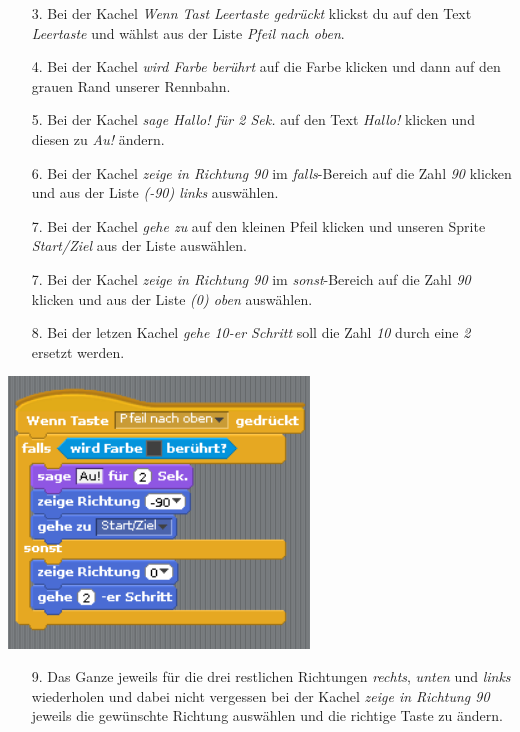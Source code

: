 \begin{itemize}
\item[3. ] Bei der Kachel \textit{Wenn Tast Leertaste gedr{\"u}ckt} klickst du auf den Text \textit{Leertaste} und w{\"a}hlst aus der Liste \textit{Pfeil nach oben}.
\item[4. ] Bei der Kachel \textit{wird Farbe ber{\"u}hrt} auf die Farbe klicken und dann auf den grauen Rand unserer Rennbahn.
\item[5. ] Bei der Kachel \textit{sage Hallo! f{\"u}r 2 Sek.} auf den Text \textit{Hallo!} klicken und diesen zu \textit{Au!} {\"a}ndern.
\item[6. ] Bei der Kachel \textit{zeige in Richtung 90} im \textit{falls}-Bereich auf die Zahl \textit{90} klicken und aus der Liste \textit{(-90) links} ausw{\"a}hlen.
\item[7. ] Bei der Kachel \textit{gehe zu} auf den kleinen Pfeil klicken und unseren Sprite \textit{Start/Ziel} aus der Liste ausw\"ahlen.
\item[7. ] Bei der Kachel \textit{zeige in Richtung 90} im \textit{sonst}-Bereich auf die Zahl \textit{90} klicken und aus der Liste \textit{(0) oben} ausw{\"a}hlen.
\item[8. ] Bei der letzen Kachel \textit{gehe 10-er Schritt} soll die Zahl \textit{10} durch eine \textit{2} ersetzt werden.
\end{itemize}
\includegraphics[width=0.6\textwidth]{images/aufgabe4_bewege_katze_nach_oben.png}

\begin{itemize}
\item[9. ] Das Ganze jeweils f{\"u}r die drei restlichen Richtungen \textit{rechts}, \textit{unten} und \textit{links} wiederholen und dabei nicht vergessen bei der Kachel \textit{zeige in Richtung 90} jeweils die gew{\"u}nschte Richtung ausw{\"a}hlen und die richtige Taste zu \"andern.
\end{itemize}

